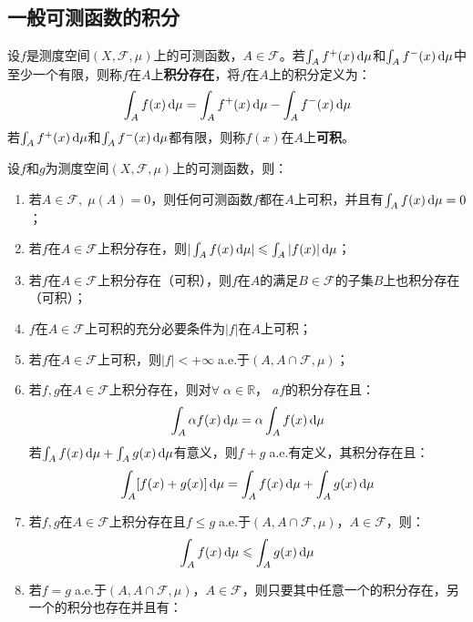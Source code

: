 \subsection{一般可测函数的积分}
\begin{definition}
	设$f$是测度空间$(X,\mathscr{F},\mu)$上的可测函数，$A\in\mathscr{F}$。若$\int_{A}f^+(x)\mathop{}\!\mathrm{d}\mu$和$\int_{A}f^-(x)\mathop{}\!\mathrm{d}\mu$中至少一个有限，则称$f$在$A$上\textbf{积分存在}，将$f$在$A$上的积分定义为：
	\begin{equation*}
		\int_{A}f(x)\mathop{}\!\mathrm{d}\mu=\int_{A}f^+(x)\mathop{}\!\mathrm{d}\mu-\int_{A}f^-(x)\mathop{}\!\mathrm{d}\mu
	\end{equation*}
	若$\int_{A}f^+(x)\mathop{}\!\mathrm{d}\mu$和$\int_{A}f^-(x)\mathop{}\!\mathrm{d}\mu$都有限，则称$f(x)$在$A$上\textbf{可积}。
\end{definition} 
\begin{property}\label{prop:MeasurableIntegral}
	设$f$和$g$为测度空间$(X,\mathscr{F},\mu)$上的可测函数，则：
	\begin{enumerate}
		\item 若$A\in\mathscr{F},\;\mu(A)=0$，则任何可测函数$f$都在$A$上可积，并且有$\int_{A}f(x)\mathop{}\!\mathrm{d}\mu=0$；
		\item 若$f$在$A\in\mathscr{F}$上积分存在，则$|\int_{A}f(x)\mathop{}\!\mathrm{d}\mu|\leqslant\int_{A}|f(x)|\mathop{}\!\mathrm{d}\mu$；
		\item 若$f$在$A\in\mathscr{F}$上积分存在（可积），则$f$在$A$的满足$B\in\mathscr{F}$的子集$B$上也积分存在（可积）；
		\item $f$在$A\in\mathscr{F}$上可积的充分必要条件为$|f|$在$A$上可积；
		\item 若$f$在$A\in\mathscr{F}$上可积，则$|f|<+\infty\;$a.e.于$(A,A\cap\mathscr{F},\mu)$；
		\item 若$f,g$在$A\in\mathscr{F}$上积分存在，则对$\forall\;\alpha\in\mathbb{R}$， $af$的积分存在且：
		\begin{equation*}
			\int_{A}\alpha f(x)\mathop{}\!\mathrm{d}\mu=\alpha\int_{A}f(x)\mathop{}\!\mathrm{d}\mu
		\end{equation*}
		若$\int_{A}f(x)\mathop{}\!\mathrm{d}\mu+\int_{A}g(x)\mathop{}\!\mathrm{d}\mu$有意义，则$f+g\;$a.e.有定义，其积分存在且：
		\begin{equation*}
			\int_{A}[f(x)+g(x)]\mathop{}\!\mathrm{d}\mu=\int_{A}f(x)\mathop{}\!\mathrm{d}\mu+\int_{A}g(x)\mathop{}\!\mathrm{d}\mu
		\end{equation*}
		\item 若$f,g$在$A\in\mathscr{F}$上积分存在且$f\leqslant g\;$a.e.于$(A,A\cap\mathscr{F},\mu)$，$A\in\mathscr{F}$，则：
		\begin{equation*}
			\int_{A}f(x)\mathop{}\!\mathrm{d}\mu\leqslant\int_{A}g(x)\mathop{}\!\mathrm{d}\mu
		\end{equation*}
		\item 若$f=g\;$a.e.于$(A,A\cap\mathscr{F},\mu)$，$A\in\mathscr{F}$，则只要其中任意一个的积分存在，另一个的积分也存在并且有：

\end{enumerate}
\end{property}
